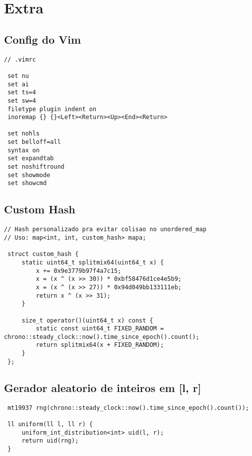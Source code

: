 \documentclass[11pt, a4paper, twoside]{article}
\begin{document}
\pagebreak


%
%

\section{Extra}

\subsection{Config do Vim}
\begin{lstlisting}
// .vimrc

 set nu
 set ai
 set ts=4
 set sw=4
 filetype plugin indent on
 inoremap {} {}<Left><Return><Up><End><Return> 
 
 set nohls
 set belloff=all
 syntax on
 set expandtab
 set noshiftround
 set showmode
 set showcmd
\end{lstlisting}

\subsection{Custom Hash}
\begin{lstlisting}
// Hash personalizado pra evitar colisao no unordered_map
// Uso: map<int, int, custom_hash> mapa;

 struct custom_hash {
     static uint64_t splitmix64(uint64_t x) {
         x += 0x9e3779b97f4a7c15;
         x = (x ^ (x >> 30)) * 0xbf58476d1ce4e5b9;
         x = (x ^ (x >> 27)) * 0x94d049bb133111eb;
         return x ^ (x >> 31);
     }
 
     size_t operator()(uint64_t x) const {
         static const uint64_t FIXED_RANDOM = chrono::steady_clock::now().time_since_epoch().count();
         return splitmix64(x + FIXED_RANDOM);
     }
 };
\end{lstlisting}

\subsection{Gerador aleatorio de inteiros em [l, r]}
\begin{lstlisting}
 mt19937 rng(chrono::steady_clock::now().time_since_epoch().count());
 
 ll uniform(ll l, ll r) {
     uniform_int_distribution<int> uid(l, r);
     return uid(rng);
 }
\end{lstlisting}
\end{document}
